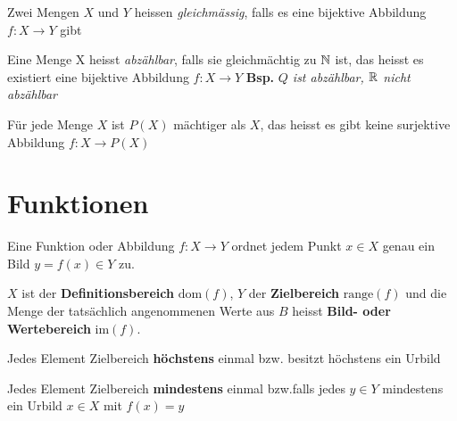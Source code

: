 \documentclass[a4paper]{article}
\begin{document}
\begin{multicols}{2}
	\begin{fsatz}
	\vspace{-2.5mm}
		Zwei Mengen $X$ und $Y$ heissen \textit{gleichmässig}, falls
		es eine bijektive Abbildung $f: X \rightarrow Y$ gibt
	\end{fsatz}

	\begin{fsatz}
	\vspace{-2.5mm}
		Eine Menge X heisst \textit{abzählbar}, falls sie
		gleichmächtig zu $\mathbb{N}$ ist, das heisst es existiert eine
		bijektive Abbildung $f: X \rightarrow Y$ \textbf{Bsp.} \textit{$Q$ ist
		abzählbar, $\mathbb{R}$ nicht abzählbar}
	\end{fsatz}

	\begin{fsatz}
	\vspace{-2.5mm}
		Für jede Menge $X$ ist $P(X)$ mächtiger als $X$, das heisst
		es gibt keine surjektive Abbildung $f: X \rightarrow P(X)$
	\end{fsatz}
\end{multicols}
\newpage
\section{Funktionen}

	\begin{fdef}
	\vspace{-2.5mm}
		Eine Funktion oder Abbildung $f: X \rightarrow Y$ ordnet
		jedem Punkt $x \in X$ genau ein Bild $y = f(x) \in Y$ zu.
	\end{fdef}

	$X$ ist der \textbf{Definitionsbereich} $\text{dom}(f)$, $Y$ der
	\textbf{Zielbereich} $\text{range}(f)$ und die Menge der tatsächlich
	angenommenen Werte aus $B$ heisst \textbf{Bild- oder Wertebereich}
	$\text{im}(f)$.

	\begin{multicols}{2}
	\begin{fdef}[injektiv  $\forall x_1, x_2 \in X : (f(x_1)= f(x_2) \Rightarrow x_1=x_2$]
		Jedes Element Zielbereich \textbf{höchstens} einmal bzw. besitzt höchstens ein Urbild\\[-3.5mm]
	\end{fdef}
	\begin{fdef}[surjektiv $\forall y \in Y \ \exists x \in X : f(x)=y$]
		Jedes Element Zielbereich \textbf{mindestens} einmal
		bzw.falls jedes $y \in Y$ mindestens ein Urbild $x \in X$
		mit $f(x) = y$
	\end{fdef}
	\end{multicols}
\end{document}
